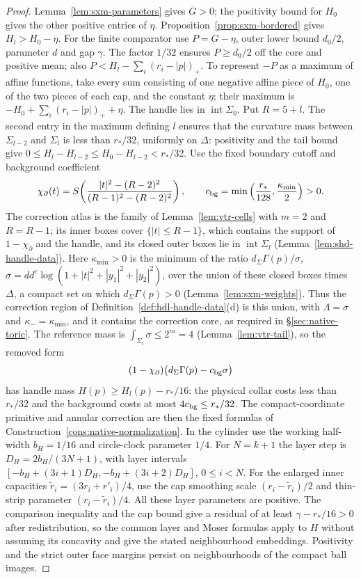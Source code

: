 \begin{proof}
Lemma~\ref{lem:sxm-parameters} gives $\overline G>0$; the positivity bound for $H_0$ gives the
other positive entries of $\eta$. Proposition~\ref{prop:sxm-bordered} gives $H_l>H_0-\eta$.
For the finite comparator use $P=G-\eta$, outer lower bound $d_0/2$, parameter $d$ and gap $\gamma$.
The factor $1/32$ ensures $P\ge d_0/2$ off the core and positive mean; also
$P<H_l-\sum_i(r_i-|p|)_+$. To represent $-P$ as a maximum of affine functions, take every sum consisting
of one negative affine piece of $H_0$, one of the two pieces of each cap, and
the constant $\eta$; their maximum is $-H_0+\sum_i(r_i-|p|)_++\eta$.
The handle lies in $\operatorname{int}\Sigma_0$. Put $R=5+l$. The second entry in the maximum defining $l$ ensures that the curvature mass between $\Sigma_{l-2}$ and $\Sigma_l$ is less than $r_*/32$,
uniformly on $\Delta$: positivity and the tail bound give
$0\le H_l-H_{l-2}\le H_0-H_{l-2}<r_*/32$.
Use the fixed boundary cutoff and background coefficient
\[
 \chi_\partial(t)=S\!\left(\frac{|t|^2-(R-2)^2}{(R-1)^2-(R-2)^2}\right),\qquad
 c_{\rm bg}=\min\left(\frac{r_*}{128},\frac{\kappa_{\min}}2\right)>0.
\]
The correction atlas is the family of Lemma~\ref{lem:vtr-cells} with $m=2$ and $R=R-1$; its inner boxes cover
$\{|t|\le R-1\}$, which contains the support of $1-\chi_\partial$ and the handle, and its closed outer boxes lie in
$\operatorname{int}\Sigma_l$ (Lemma~\ref{lem:shd-handle-data}). Here $\kappa_{\min}>0$ is the minimum of the ratio
$d_\Sigma\Gamma(p)/\sigma$, $\sigma=dd^c\log(1+|t|^2+|y_1|^2+|y_2|^2)$, over the union of these closed boxes times $\Delta$, a
compact set on which $d_\Sigma\Gamma(p)>0$ (Lemma~\ref{lem:sxm-weights}). Thus the correction region of
Definition~\ref{def:hdl-handle-data}(d) is this union, with $\Lambda=\sigma$ and $\kappa_-=\kappa_{\min}$, and it contains the
correction core, as required in \S\ref{sec:native-toric}.
The reference mass is $\int_{\Sigma_l}\sigma\le2^m=4$ (Lemma~\ref{lem:vtr-tail}), so the removed form
\[
 (1-\chi_\partial)\bigl(d_\Sigma\Gamma(p)-c_{\rm bg}\sigma\bigr)
\]
has handle mass $H(p)\ge H_l(p)-r_*/16$: the physical collar costs less than $r_*/32$ and the background costs at most
$4c_{\rm bg}\le r_*/32$. The compact-coordinate primitive and annular correction are then the fixed formulas
of Construction~\ref{cons:native-normalization}. In the cylinder use the working half-width $b_H=1/16$ and circle-clock parameter $1/4$.
For $N=k+1$ the layer step is $D_H=2b_H/(3N+1)$, with layer intervals
$[-b_H+(3i+1)D_H,-b_H+(3i+2)D_H]$, $0\le i<N$.
For the enlarged inner capacities $\widetilde r_i=(3r_i+r'_i)/4$, use the cap smoothing scale
$(r_i-\widetilde r_i)/2$ and thin-strip parameter $(r_i-\widetilde r_i)/4$.
All these layer parameters are positive.
The comparison inequality and the cap bound give a residual of at least
$\gamma-r_*/16>0$ after redistribution, so the common layer and Moser formulas apply to $H$
without assuming its concavity and give the stated neighbourhood embeddings.
Positivity and the strict outer face margins persist on neighbourhoods of the compact ball images.
\end{proof}

